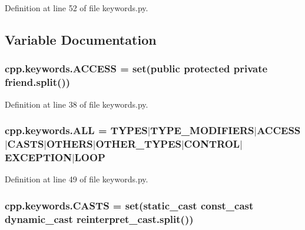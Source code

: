 Definition at line 52 of file keywords.\+py.



\subsection{Variable Documentation}
\subsubsection[{\texorpdfstring{A\+C\+C\+E\+SS}{ACCESS}}]{\setlength{\rightskip}{0pt plus 5cm}cpp.\+keywords.\+A\+C\+C\+E\+SS = set(\textquotesingle{}public protected private friend\textquotesingle{}.split())}\hypertarget{namespacecpp_1_1keywords_a786f41bbea982641425c819d10bb2064}{}\label{namespacecpp_1_1keywords_a786f41bbea982641425c819d10bb2064}


Definition at line 38 of file keywords.\+py.

\subsubsection[{\texorpdfstring{A\+LL}{ALL}}]{\setlength{\rightskip}{0pt plus 5cm}cpp.\+keywords.\+A\+LL = {\bf T\+Y\+P\+ES}$\vert${\bf T\+Y\+P\+E\+\_\+\+M\+O\+D\+I\+F\+I\+E\+RS}$\vert${\bf A\+C\+C\+E\+SS}$\vert${\bf C\+A\+S\+TS}$\vert${\bf O\+T\+H\+E\+RS}$\vert${\bf O\+T\+H\+E\+R\+\_\+\+T\+Y\+P\+ES}$\vert${\bf C\+O\+N\+T\+R\+OL}$\vert${\bf E\+X\+C\+E\+P\+T\+I\+ON}$\vert${\bf L\+O\+OP}}\hypertarget{namespacecpp_1_1keywords_a2e8727b78fb9434c99ac8518c6dd1ecc}{}\label{namespacecpp_1_1keywords_a2e8727b78fb9434c99ac8518c6dd1ecc}


Definition at line 49 of file keywords.\+py.

\subsubsection[{\texorpdfstring{C\+A\+S\+TS}{CASTS}}]{\setlength{\rightskip}{0pt plus 5cm}cpp.\+keywords.\+C\+A\+S\+TS = set(\textquotesingle{}static\+\_\+cast const\+\_\+cast dynamic\+\_\+cast reinterpret\+\_\+cast\textquotesingle{}.split())}\hypertarget{namespacecpp_1_1keywords_aeba38dc38e188040f4ec44ba05092e7f}{}\label{namespacecpp_1_1keywords_aeba38dc38e188040f4ec44ba05092e7f}


